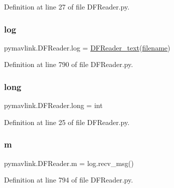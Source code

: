 Definition at line 27 of file D\+F\+Reader.\+py.

\mbox{\label{namespacepymavlink_1_1DFReader_abc349a115aebbad3bf47cfd5e1e4f983}} 
\subsubsection{\texorpdfstring{log}{log}}
{\footnotesize\ttfamily pymavlink.\+D\+F\+Reader.\+log = \mbox{\hyperlink{classpymavlink_1_1DFReader_1_1DFReader__text}{D\+F\+Reader\+\_\+text}}(\mbox{\hyperlink{namespacepymavlink_1_1DFReader_a9653e10b2651c68cf8b171d8dd60f10c}{filename}})}



Definition at line 790 of file D\+F\+Reader.\+py.

\mbox{\label{namespacepymavlink_1_1DFReader_ac95074392c85e56dacbbcd276f0bec8f}} 
\subsubsection{\texorpdfstring{long}{long}}
{\footnotesize\ttfamily pymavlink.\+D\+F\+Reader.\+long = int}



Definition at line 25 of file D\+F\+Reader.\+py.

\mbox{\label{namespacepymavlink_1_1DFReader_a41dcad484f9dfcaca656786d0882f168}} 
\subsubsection{\texorpdfstring{m}{m}}
{\footnotesize\ttfamily pymavlink.\+D\+F\+Reader.\+m = log.\+recv\+\_\+msg()}



Definition at line 794 of file D\+F\+Reader.\+py.

\mbox{\label{namespacepymavlink_1_1DFReader_a179a528de5d43521d3f2f71e8dc137ed}} 
